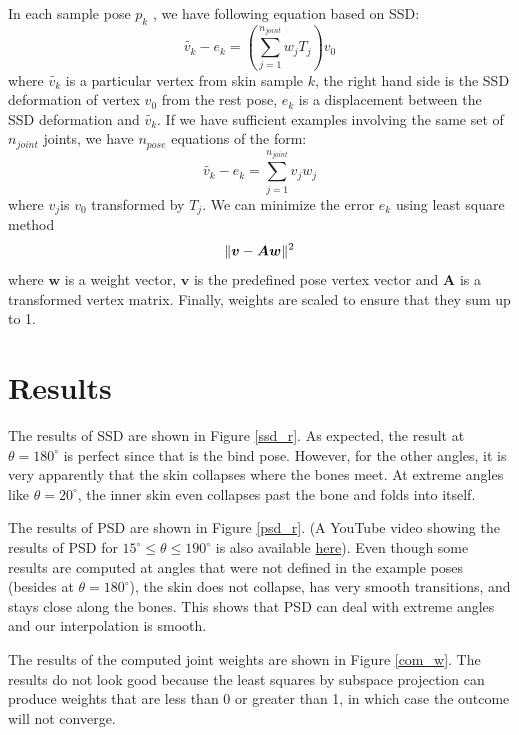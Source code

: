 \documentclass[11pt,twocolumn,letterpaper]{article}
\begin{document}
In each sample pose $p_k$ , we have following equation based on SSD:
\begin{equation}
	\tilde{v_k}-e_k=(\sum_{j=1}^{n_{joint}}w_jT_j)v_0
\end{equation}
where $\tilde{v_k}$ is a particular vertex from skin sample $k$, the right hand side is the SSD deformation of vertex $v_0$ from the rest pose, $e_k$ is a displacement between the SSD deformation and $\tilde{v_k}$.
If we have sufficient examples involving the same set of $n_{joint}$ joints, we have $n_{pose}$ equations of the form:
\begin{equation}
	\tilde{v_k}-e_k=\sum_{j=1}^{n_{joint}}v_jw_j
\end{equation}
where $v_j$is $v_0$ transformed by $T_j$. We can minimize the error $e_k$ using least square method
\begin{equation}
	\Arrowvert\boldsymbol{v}-\boldsymbol{Aw}\Arrowvert^2
\end{equation}
where $\boldsymbol{w}$ is a weight vector, $\boldsymbol{v}$ is the predefined pose vertex vector and $\boldsymbol{A}$ is a transformed vertex matrix. Finally, weights are scaled to ensure that they sum up to 1.

\section{Results}

The results of SSD are shown in Figure \ref{ssd_r}. As expected, the result at $\theta = 180^{\circ}$ is perfect since that is the bind pose. However, for the other angles, it is very apparently that the skin collapses where the bones meet. At extreme angles like $\theta = 20^{\circ}$, the inner skin even collapses past the bone and folds into itself.

The results of PSD are shown in Figure \ref{psd_r}. (A YouTube video showing the results of PSD for $15^{\circ} \leq \theta \leq 190^{\circ}$ is also available \href{https://youtu.be/v3lwH1p3HBU}{here}). Even though some results are computed at angles that were not defined in the example poses (besides at $\theta = 180^{\circ}$), the skin does not collapse, has very smooth transitions, and stays close along the bones. This shows that PSD can deal with extreme angles and our interpolation is smooth.

The results of the computed joint weights are shown in Figure \ref{com_w}. The results do not look good because the least squares by subspace projection can produce weights that are less than 0 or greater than 1, in which case the outcome will not converge.
\end{document}
